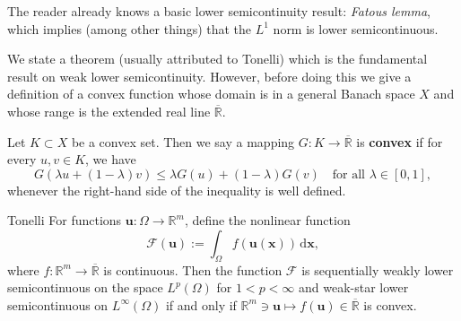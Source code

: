 \begin{Remark}
\label{rem:fatou-lone-norm-lower-semicontinuity}
The reader already knows a basic lower semicontinuity result: \emph{Fatou\textquotesingle s lemma}, which implies (among other things) that the $L^1$ norm is lower semicontinuous.
\end{Remark}

We state a theorem (usually attributed to Tonelli) which is the fundamental result on weak lower semicontinuity. However, before doing this we give a definition of a convex function whose domain is in a general Banach space $X$ and whose range is the extended real line $\overline{\mathbb{R}}$.

\begin{Definition}
\label{def:extended-real-convex-function}
Let $K\subset X$ be a convex set. Then we say a mapping $G:K\to\overline{\mathbb{R}}$ is \textbf{convex} if for every $u,v\in K$, we have
\begin{equation}\label{eq:extended-real-convex-function-definition}
G(\lambda u+(1-\lambda)v)\leq\lambda G(u)+(1-\lambda)G(v)\quad\text{for all }\lambda\in[0,1],
\end{equation}
whenever the right-hand side of the inequality is well defined.
\end{Definition}

\begin{Theorem}{Tonelli}
\label{thm:tonelli-convexity-weak-lower-semicontinuity}
For functions $\bm{u}:\Omega\to\mathbb{R}^m$, define the nonlinear function
\begin{equation}\label{eq:tonelli-integral-functional-definition}
\mathcal{F}(\bm{u}):=\int_\Omega f(\bm{u}(\bm{x}))\,\mathrm{d}\bm{x},
\end{equation}
where $f:\mathbb{R}^m\to\overline{\mathbb{R}}$ is continuous. Then the function $\mathcal{F}$ is sequentially weakly lower semicontinuous on the space $L^p(\Omega)$ for $1<p<\infty$ and weak-star lower semicontinuous on $L^\infty(\Omega)$ if and only if $\mathbb{R}^m\ni\bm{u}\mapsto f(\bm{u})\in\overline{\mathbb{R}}$ is convex.
\end{Theorem}

\begingroup
\renewcommand{\endProof}{\par}
\endgroup

